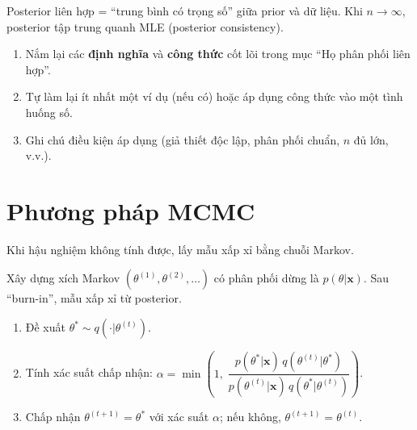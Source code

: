 \documentclass[12pt,a4paper]{article}
\begin{document}
\begin{luuy}
  Posterior liên hợp = ``trung bình có trọng số'' giữa prior và dữ liệu. Khi $n \to \infty$, posterior tập trung quanh MLE (posterior consistency).
\end{luuy}


\begin{tongket}[title={Tổng kết: Họ phân phối liên hợp}]
\begin{enumerate}
  \item Nắm lại các \textbf{định nghĩa} và \textbf{công thức} cốt lõi trong mục ``Họ phân phối liên hợp''.
  \item Tự làm lại ít nhất một ví dụ (nếu có) hoặc áp dụng công thức vào một tình huống số.
  \item Ghi chú điều kiện áp dụng (giả thiết độc lập, phân phối chuẩn, $n$ đủ lớn, v.v.).
\end{enumerate}
\end{tongket}

\section{Phương pháp MCMC}

\begin{dongco}[title={Động cơ --- Phương pháp MCMC}]
Khi hậu nghiệm không tính được, lấy mẫu xấp xỉ bằng chuỗi Markov.
\end{dongco}

\begin{dinhnghia}[title={Monte Carlo Markov Chain}]
  Xây dựng xích Markov $(\theta^{(1)}, \theta^{(2)}, \ldots)$ có phân phối dừng là $p(\theta|\mathbf{x})$. Sau ``burn-in'', mẫu xấp xỉ từ posterior.
\end{dinhnghia}

\begin{phuongphap}[title={Metropolis--Hastings}]
  \begin{enumerate}
    \item Đề xuất $\theta^* \sim q(\cdot|\theta^{(t)})$.
    \item Tính xác suất chấp nhận: $\alpha = \min\!\left(1,\; \dfrac{p(\theta^*|\mathbf{x})\,q(\theta^{(t)}|\theta^*)}{p(\theta^{(t)}|\mathbf{x})\,q(\theta^*|\theta^{(t)})}\right)$.
    \item Chấp nhận $\theta^{(t+1)} = \theta^*$ với xác suất $\alpha$; nếu không, $\theta^{(t+1)} = \theta^{(t)}$.
  \end{enumerate}
\end{phuongphap}
\end{document}
